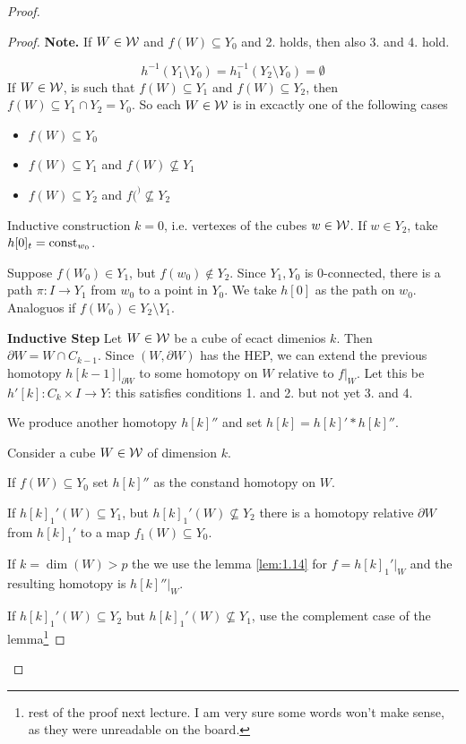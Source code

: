 \documentclass[language=english]{TemplateLecture}
\begin{document}
\begin{proof}
\begin{proof}
        \textbf{Note.} If \(W \in \mathcal{W}\) and \(f(W)\subseteq Y_0\) and 2. holds, then also 3. and 4. hold.

        \[h^{-1}(Y_1\setminus Y_0) = h_1^{-1}(Y_2\setminus Y_0) = \emptyset\]
        If \(W \in \mathcal{W}\), is such that \(f(W) \subseteq Y_1\) and \(f(W) \subseteq Y_2\), then \(f(W)\subseteq Y_1\cap Y_2 = Y_0\). So each \(W \in \mathcal{W}\) is in excactly one of the following cases
        \begin{itemize}
            \item \(f(W) \subseteq Y_0\)
            \item \(f(W) \subseteq Y_1\) and \(f(W) \not\subseteq Y_1\)
            \item \(f(W) \subseteq Y_2\) and \(f(^)\not \subseteq Y_2\)
        \end{itemize}
        Inductive construction \(k = 0\), i.e. vertexes of the cubes \(w \in \mathcal{W}\). If \(w\in Y_2\), take \(h[0]_t = \operatorname{const}_{w_0}\).

        Suppose \(f(W_0)\in Y_1\), but \(f(w_0) \not \in Y_2\). Since \(Y_1,Y_0\) is \(0\)-connected, there is a path \(\pi\colon I \to Y_1\) from \(w_0\) to a point in \(Y_0\). We take \(h[0]\) as the path on \(w_0\). Analoguos if \(f(W_0)\in Y_2\setminus Y_1\).

        \textbf{Inductive Step} Let \(W \in \mathcal{W}\) be a cube of ecact dimenios \(k\). Then \(\partial W = W \cap C_{k-1}\). Since \((W, \partial W)\) has the HEP, we can extend the previous homotopy \(h[k-1]\rvert_{\partial W}\) to some homotopy on \(W\) relative to \(f\rvert_W\). Let this be \(h'[k]\colon C_k\times I \to Y\): this satisfies conditions 1. and 2. but not yet 3. and 4.

        We produce another homotopy \(h[k]''\) and set \(h[k] = h[k]' * h[k]''\).

        Consider a cube \(W \in \mathcal{W}\) of dimension \(k\).

        If \(f(W) \subseteq Y_0\) set \(h[k]''\) as the constand homotopy on \(W\).

        If \(h[k]_1'(W) \subseteq Y_1\), but \(h[k]_1'(W) \not \subseteq Y_2\) there is a homotopy relative \(\partial W\) from \(h[k]_1'\) to a map \(f_1(W)\subseteq Y_0\).

        If \(k = \dim(W) > p\) the we use the lemma \ref{lem:1.14} for \(f = h[k]_1'\rvert_W\) and the resulting homotopy is \(h[k]''\rvert_W\).

        If \(h[k]_1'(W)\subseteq Y_2\) but \(h[k]_1'(W) \not \subseteq Y_1\), use the complement case of the lemma\footnote{rest of the proof next lecture. I am very sure some words won't make sense, as they were unreadable on the board.}
    \end{proof}
\end{proof}
\end{document}
